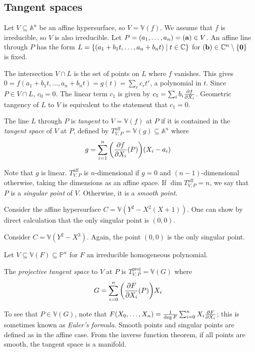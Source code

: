 \subsection{Tangent spaces}
Let \( V \subseteq \mathbb A^n \) be an affine hypersurface, so \( V = \mathbb V(f) \).
We assume that \( f \) is irreducible, so \( V \) is also irreducible.
Let \( P = (a_1, \dots, a_n) = (\vb a) \in V \).
An affine line through \( P \) has the form \( L = \qty{(a_1 + b_1 t, \dots, a_n + b_n t) \mid t \in \mathbb C} \) for \( (\vb b) \in \mathbb C^n \setminus \qty{\vb 0} \) is fixed.

The intersection \( V \cap L \) is the set of points on \( L \) where \( f \) vanishes.
This gives \( 0 = f(a_1 + b_1 t, \dots, a_n + b_n t) = g(t) = \sum_r c_r t^r \), a polynomial in \( t \).
Since \( P \in V \cap L \), \( c_0 = 0 \).
The linear term \( c_1 \) is given by \( c_1 = \sum_i b_i \pdv{f}{X_i}(\vb a) \).
Geometric tangency of \( L \) to \( V \) is equivalent to the statement that \( c_1 = 0 \).
\begin{definition}
    The line \( L \) through \( P \) is \emph{tangent} to \( V = \mathbb V(f) \) at \( P \) if it is contained in the \emph{tangent space} of \( V \) at \( P \), defined by \( T_{V,P}^{\mathrm{aff}} = \mathbb V(g) \subseteq \mathbb A^n \) where
    \[ g = \sum_{i=1}^n \qty(\pdv{f}{X_i}\qty(P))(X_i - a_i) \]
\end{definition}
Note that \( g \) is linear.
\( T_{V,P}^{\mathrm{aff}} \) is \( n \)-dimensional if \( g = 0 \) and \( (n-1) \)-dimensional otherwise, taking the dimensions as an affine space.
If \( \dim T_{V,P}^{\mathrm{aff}} = n \), we say that \( P \) is a \emph{singular point} of \( V \).
Otherwise, it is a \emph{smooth point}.
\begin{example}
    Consider the affine hypersurface \( C = \mathbb V(Y^2 - X^2(X+1)) \).
    One can show by direct calculation that the only singular point is \( (0, 0) \).
\end{example}
\begin{example}[cusp]
    Consider \( C = \mathbb V(Y^2 - X^3) \).
    Again, the point \( (0, 0) \) is the only singular point.
\end{example}
Let \( V \subseteq \mathbb V(F) \subseteq \mathbb P^n \) for \( F \) an irreducible homogeneous polynomial.
\begin{definition}
    The \emph{projective tangent space} to \( V \) at \( P \) is \( T_{V,P}^{\mathrm{proj}} = \mathbb V(G) \) where
    \[ G = \sum_{i=0}^n \qty(\pdv{F}{X_i}\qty(P)) X_i \]
\end{definition}
To see that \( P \in \mathbb V(G) \), note that \( F(X_0, \dots, X_n) = \frac{1}{\deg F} \sum_{i=0}^n X_i \pdv{F}{X_i} \); this is sometimes known as \emph{Euler's formula}.
Smooth points and singular points are defined as in the affine case.
From the inverse function theorem, if all points are smooth, the tangent space is a manifold.

